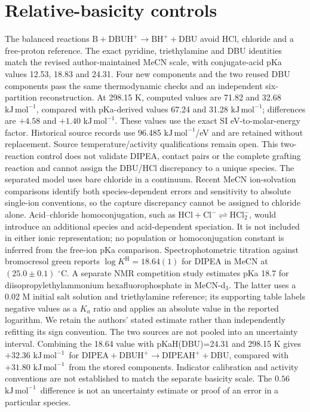 \documentclass[11pt]{article}
\newcommand{\kj}{\ensuremath{\mathrm{kJ\,mol^{-1}}}}
\begin{document}
\section{Relative-basicity controls}
The balanced reactions $\mathrm{B+DBUH^+\rightarrow BH^++DBU}$ avoid HCl, chloride and a free-proton reference. The exact pyridine, triethylamine and DBU identities match the revised author-maintained MeCN scale, with conjugate-acid pKa values 12.53, 18.83 and 24.31.\cite{basicity2019,pkaTables} Four new components and the two reused DBU components pass the same thermodynamic checks and an independent six-partition reconstruction. At 298.15 K, computed values are 71.82 and 32.68 \kj, compared with pKa-derived values 67.24 and 31.28 \kj; differences are $+4.58$ and $+1.40$ \kj. These values use the exact SI eV-to-molar-energy factor. Historical source records use 96.485 \kj/eV and are retained without replacement. Source temperature/activity qualifications remain open. This two-reaction control does not validate DIPEA, contact pairs or the complete grafting reaction and cannot assign the DBU/HCl discrepancy to a unique species. The separated model uses bare chloride in a continuum. Recent MeCN ion-solvation comparisons identify both species-dependent errors and sensitivity to absolute single-ion conventions, so the capture discrepancy cannot be assigned to chloride alone.\cite{pliego2024} Acid--chloride homoconjugation, such as $\mathrm{HCl+Cl^-\rightleftharpoons HCl_2^-}$, would introduce an additional species and acid-dependent speciation. It is not included in either ionic representation; no population or homoconjugation constant is inferred from the free-ion pKa comparison.
Spectrophotometric titration against bromocresol green reports $\log K^{\mathrm H}=18.64(1)$ for DIPEA in MeCN at $(25.0\pm0.1)$ $^\circ$C.\cite{barisic2021dipea} A separate NMR competition study estimates pKa 18.7 for diisopropylethylammonium hexafluorophosphate in MeCN-d$_3$.\cite{cook2024dipea} The latter uses a 0.02 M initial salt solution and triethylamine reference; its supporting table labels negative values as a $K_a$ ratio and applies an absolute value in the reported logarithm. We retain the authors' stated estimate rather than independently refitting its sign convention. The two sources are not pooled into an uncertainty interval. Combining the 18.64 value with pKaH(DBU)=24.31 and 298.15 K gives $+32.36$ \kj\ for $\mathrm{DIPEA+DBUH^+\rightarrow DIPEAH^++DBU}$, compared with $+31.80$ \kj\ from the stored components. Indicator calibration and activity conventions are not established to match the separate basicity scale. The $0.56$ \kj\ difference is not an uncertainty estimate or proof of an error in a particular species.
\end{document}
